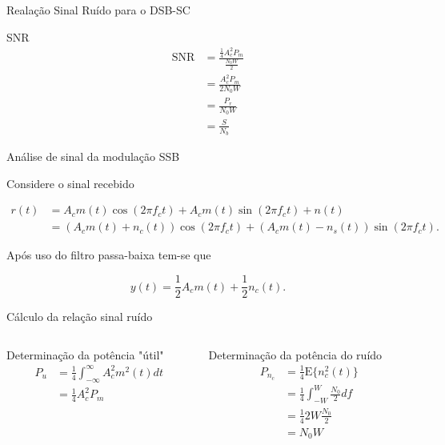 \documentclass[aspectratio=169,dvipsnames]{beamer}
\begin{document}
\begin{frame}{Realação Sinal Ruído para o DSB-SC}
    \begin{block}{SNR}
    \begin{align*}
        \textrm{SNR} &= \frac{\frac{1}{4} A^2_c P_m}{ \frac{N_0W}{2}} \\
                     &=\frac{A^2_c P_m}{ 2N_0W} \\
                     &=\frac{P_r}{ N_0W} \\
                     &= \frac{S}{N_b}
    \end{align*} 
\end{block}
\end{frame}




\begin{frame}{Análise de sinal da modulação SSB}

 Considere o sinal recebido 

 \begin{align*}
r(t) &= A_c m(t) \cos(2\pi f_c t) + A_c m(t) \sin(2\pi f_c t) + n(t) \\
     &= (A_c m(t) + n_c(t)) \cos(2\pi f_c t) + (A_c m(t) - n_s(t)) \sin(2\pi f_c t).
\end{align*}

Após uso do filtro passa-baixa tem-se que

$$
y(t) = \frac{1}{2} A_c m(t)  + \frac{1}{2} n_c(t).
$$
    
\end{frame}


\begin{frame}{Cálculo da relação sinal ruído}
\begin{columns}[T]
\begin{column}{0.5\textwidth}
Determinação da potência "útil"
\begin{align*}
    P_u &= \frac{1}{4}\int _{-\infty}^{\infty} A^2_c m^2(t) dt\\ 
        &= \frac{1}{4} A^2_c P_m
\end{align*}
\end{column}

\begin{column}{0.5\textwidth}
Determinação da potência do ruído
\begin{align*}
    P_{n_c} &= \frac{1}{4}\textrm{E}\{ n^2_c(t)\} \\
            &=  \frac{1}{4} \int _{-W}^{W} \frac{N_0}{2} df \\
            &=  \frac{1}{4} 2W \frac{N_0}{2} \\
            &= N_0W
\end{align*}
\end{column}
\end{columns}
\end{frame}
\end{document}
